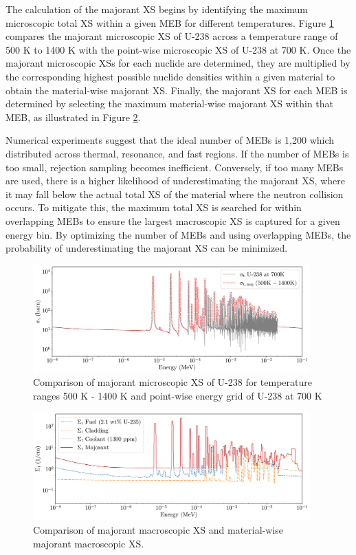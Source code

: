 The calculation of the majorant XS begins by identifying the maximum microscopic total XS within a given MEB for different temperatures. Figure \ref{fig_2} compares the majorant microscopic XS of U-238 across a temperature range of 500 K to 1400 K with the point-wise microscopic XS of U-238 at 700 K. Once the majorant microscopic XSs for each nuclide are determined, they are multiplied by the corresponding highest possible nuclide densities within a given material to obtain the material-wise majorant XS. Finally, the majorant XS for each MEB is determined by selecting the maximum material-wise majorant XS within that MEB, as illustrated in Figure \ref{fig_3}.

Numerical experiments suggest that the ideal number of MEBs is 1,200 which distributed across thermal, resonance, and fast regions. If the number of MEBs is too small, rejection sampling becomes inefficient. Conversely, if too many MEBs are used, there is a higher likelihood of underestimating the majorant XS, where it may fall below the actual total XS of the material where the neutron collision occurs. To mitigate this, the maximum total XS is searched for within overlapping MEBs to ensure the largest macroscopic XS is captured for a given energy bin. By optimizing the number of MEBs and using overlapping MEBs, the probability of underestimating the majorant XS can be minimized.

\begin{figure}
    \centering
    \includegraphics[width=0.95\textwidth]{figs/maj.pdf}
    \caption[Comparison of majorant microscopic XS of U-238]{Comparison of majorant microscopic XS of U-238 for temperature ranges 500 K - 1400 K and point-wise energy grid of U-238 at 700 K}
    \label{fig_2}
\end{figure}
\begin{figure}
    \centering
    \includegraphics[width=0.95\textwidth]{figs/maj_mat.pdf}
    \caption[Comparison of majorant macroscopic XS]{Comparison of majorant macroscopic XS and material-wise majorant macroscopic XS.}
    \label{fig_3}
\end{figure}


